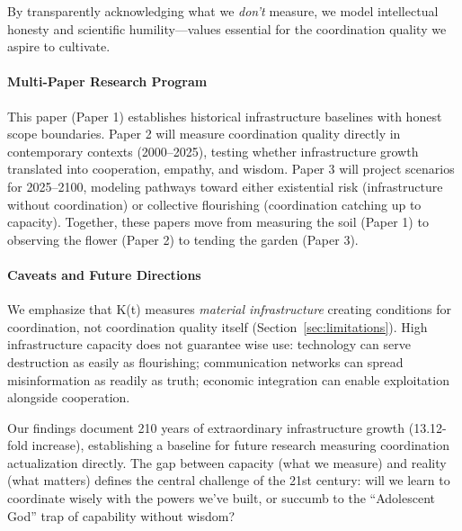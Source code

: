 \documentclass[11pt]{article}
\begin{document}
By transparently acknowledging what we \textit{don't} measure, we model
intellectual honesty and scientific humility---values essential for the
coordination quality we aspire to cultivate.


\paragraph{Multi-Paper Research Program}
This paper (Paper 1) establishes historical infrastructure baselines with honest
scope boundaries. Paper 2 will measure coordination quality directly in
contemporary contexts (2000--2025), testing whether infrastructure growth
translated into cooperation, empathy, and wisdom. Paper 3 will project scenarios
for 2025--2100, modeling pathways toward either existential risk (infrastructure
without coordination) or collective flourishing (coordination catching up to
capacity). Together, these papers move from measuring the soil (Paper 1) to
observing the flower (Paper 2) to tending the garden (Paper 3).


\paragraph{Caveats and Future Directions}
We emphasize that K(t) measures \textit{material infrastructure} creating
conditions for coordination, not coordination quality itself
(Section~\ref{sec:limitations}). High infrastructure capacity does not guarantee
wise use: technology can serve destruction as easily as flourishing;
communication networks can spread misinformation as readily as truth; economic
integration can enable exploitation alongside cooperation.

Our findings document 210 years of extraordinary infrastructure growth
(13.12-fold increase), establishing a baseline for future research measuring
coordination actualization directly. The gap between capacity (what we measure)
and reality (what matters) defines the central challenge of the 21st century:
will we learn to coordinate wisely with the powers we've built, or succumb to
the ``Adolescent God'' trap of capability without wisdom?
\end{document}
